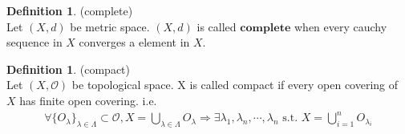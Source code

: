 \documentclass[11pt, a4paper, english, dvipdfmx]{jsarticle}
\theoremstyle{definition}
\newtheorem{Definition+}[Axiom+]{Definition}
\begin{document}
\begin{Definition+}(complete)\\
    Let $(X, d)$ be metric space.
    $(X, d)$ is called $\mathbf{complete}$ when every cauchy sequence in $X$ converges a element in $X$.
\end{Definition+}

\begin{Definition+}(compact)\\
    Let $(X, \mathscr{O})$ be topological space. 
    X is called compact if every open covering of $X$ has finite open covering. i.e.
    \begin{align*}
        \forall \{O_{\lambda}\}_{\lambda\in\Lambda}\subset\mathscr{O},  X = \bigcup_{\lambda\in\Lambda}O_{\lambda}\Longrightarrow\exists\lambda_{1}, \lambda_{n}, \cdots, \lambda_{n}\text{ s.t. }X = \bigcup_{i = 1}^{n}O_{\lambda_{i}}
    \end{align*}
\end{Definition+}
\end{document}
